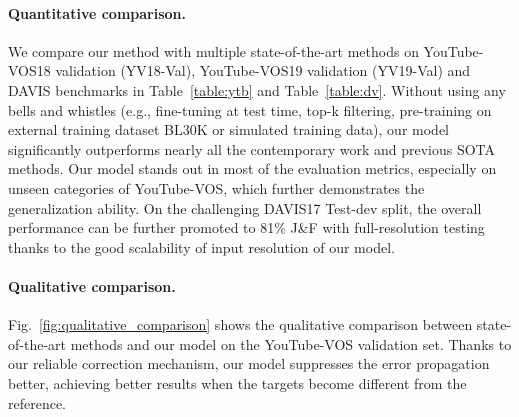 \documentclass[letterpaper]{article} \usepackage{aaai22}  \usepackage{times}  \usepackage{helvet}  \usepackage{courier}  \usepackage[hyphens]{url}  \usepackage{graphicx} \urlstyle{rm} \def\UrlFont{\rm}  \usepackage{natbib}  \usepackage{caption} \DeclareCaptionStyle{ruled}{labelfont=normalfont,labelsep=colon,strut=off} \frenchspacing  \setlength{\pdfpagewidth}{8.5in}  \setlength{\pdfpageheight}{11in}  \usepackage{algorithm}
\newcommand{\fig}[1]{Fig.~#1}
\begin{document}
\paragraph{Quantitative comparison.}
We compare our method with multiple state-of-the-art methods on YouTube-VOS18 validation (YV18-Val), YouTube-VOS19 validation (YV19-Val) and DAVIS benchmarks in Table~\ref{table:ytb} and Table~\ref{table:dv}. Without using any bells and whistles (e.g., fine-tuning at test time, top-k filtering, pre-training on external training dataset BL30K  or simulated training data), our model significantly outperforms nearly all the contemporary work and previous SOTA methods. Our model stands out in most of the evaluation metrics, especially on unseen categories of YouTube-VOS, which further demonstrates the generalization ability. On the challenging DAVIS17 Test-dev split, the overall performance can be further promoted to 81\% J\&F with full-resolution testing thanks to the good scalability of input resolution of our model.

\paragraph{Qualitative comparison.}
 \fig{\ref{fig:qualitative_comparison}} shows the qualitative comparison between state-of-the-art methods and our model on the YouTube-VOS validation set. Thanks to our reliable correction mechanism, our model suppresses the error propagation better, achieving better results when the targets become different from the reference.
\end{document}
